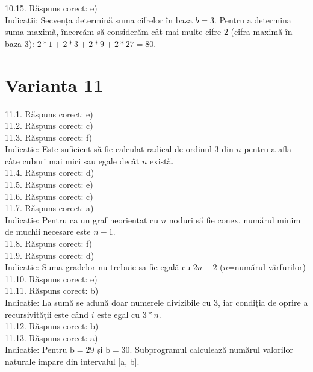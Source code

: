 10.15. Răspuns corect: e)\\
Indicații: Secvența determină suma cifrelor în baza $b=3$. Pentru a determina suma maximă, încercăm să considerăm cât mai multe cifre 2 (cifra maximă în baza 3): $2 * 1+2 * 3+2 * 9+2 * 27=80$.\\

\section*{Varianta 11}

11.1. Răspuns corect: e)\\

11.2. Răspuns corect: c)\\

11.3. Răspuns corect: f)\\
Indicație: Este suficient să fie calculat radical de ordinul 3 din $n$ pentru a afla câte cuburi mai mici sau egale decât $n$ există.\\

11.4. Răspuns corect: d)\\

11.5. Răspuns corect: e)\\

11.6. Răspuns corect: c)\\

11.7. Răspuns corect: a)\\
Indicație: Pentru ca un graf neorientat cu $n$ noduri să fie conex, numărul minim de muchii necesare este $n-1$.\\

11.8. Răspuns corect: f)\\

11.9. Răspuns corect: d)\\
Indicație: Suma gradelor nu trebuie sa fie egală cu $2n-2$ ($n$=numărul vârfurilor)\\

11.10. Răspuns corect: e)\\

11.11. Răspuns corect: b)\\
Indicație: La sumă se adună doar numerele divizibile cu 3, iar condiția de oprire a recursivității este când $i$ este egal cu $3*n$.\\

11.12. Răspuns corect: b)\\

11.13. Răspuns corect: a)\\
Indicație: Pentru $\mathrm{b}=29$ și $\mathrm{b}=30$. Subprogramul calculează numărul valorilor naturale impare din intervalul [a, b].\\

